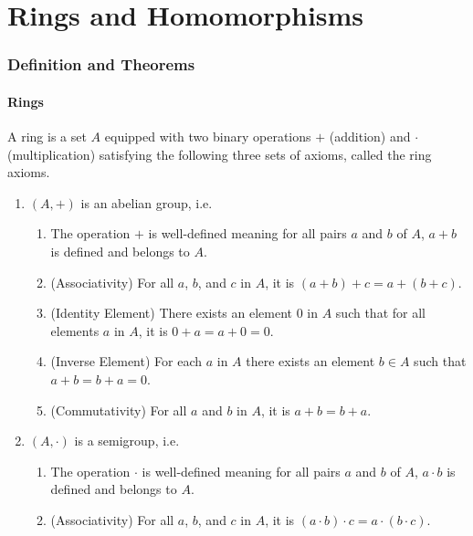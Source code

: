 \chapter{Rings and Homomorphisms}
\subsection*{Definition and Theorems}
\subsubsection*{Rings}
\begin{defbox}
    \begin{definition}[Ring]
        A {\color{maththen}ring} is a {\color{mathobj}set} \(A\) equipped with two {\color{mathobj}binary operations} \(+\) ({\color{mathrem}addition}) and \(\cdot\) ({\color{mathrem}multiplication}) satisfying the following three sets of {\color{mathrem}axioms}, called the {\color{mathrem}ring axioms}.
    \begin{enumerate}
      \item \((A, +)\) is an {\color{mathif}abelian group}, i.e.
      \begin{enumerate}
        \item The operation \(+\) is well-defined meaning for all pairs \(a\) and \(b\) of \(A\), \(a + b\) is defined and belongs to \(A\).
        \item (Associativity) For all \(a\), \(b\), and \(c\) in \(A\), it is \((a + b) + c = a + (b + c)\).
        \item (Identity Element) There exists an element \(0\) in \(A\) such that for all elements \(a\) in \(A\), it is \(0 + a = a + 0 = 0\).
        \item (Inverse Element) For each \(a\) in \(A\) there exists an element \(b \in A\) such that \(a + b = b + a = 0\).
        \item (Commutativity) For all \(a\) and \(b\) in \(A\), it is \(a + b = b + a\).
      \end{enumerate}
      \item \((A, \cdot)\) is a {\color{mathif}semigroup}, i.e.
      \begin{enumerate}
        \item The operation \(\cdot\) is well-defined meaning for all pairs \(a\) and \(b\) of \(A\), \(a \cdot b\) is defined and belongs to \(A\).
        \item (Associativity) For all \(a\), \(b\), and \(c\) in \(A\), it is \((a \cdot b) \cdot c = a \cdot (b \cdot c)\).

\end{enumerate}
\end{enumerate}
\end{definition}
\end{defbox}
